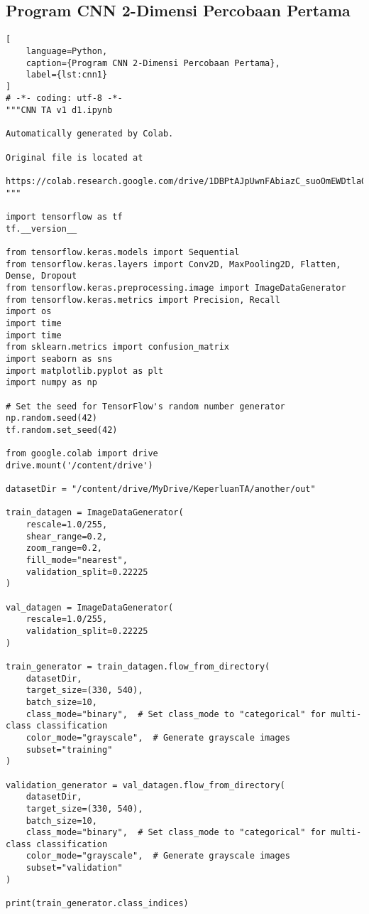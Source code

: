 \subsection*{Program CNN 2-Dimensi Percobaan Pertama}
\begin{lstlisting}[
    language=Python,
    caption={Program CNN 2-Dimensi Percobaan Pertama},
    label={lst:cnn1}
]
# -*- coding: utf-8 -*-
"""CNN TA v1 d1.ipynb

Automatically generated by Colab.

Original file is located at
    https://colab.research.google.com/drive/1DBPtAJpUwnFAbiazC_suoOmEWDtla0wC
"""

import tensorflow as tf
tf.__version__

from tensorflow.keras.models import Sequential
from tensorflow.keras.layers import Conv2D, MaxPooling2D, Flatten, Dense, Dropout
from tensorflow.keras.preprocessing.image import ImageDataGenerator
from tensorflow.keras.metrics import Precision, Recall
import os
import time
import time
from sklearn.metrics import confusion_matrix
import seaborn as sns
import matplotlib.pyplot as plt
import numpy as np

# Set the seed for TensorFlow's random number generator
np.random.seed(42)
tf.random.set_seed(42)

from google.colab import drive
drive.mount('/content/drive')

datasetDir = "/content/drive/MyDrive/KeperluanTA/another/out"

train_datagen = ImageDataGenerator(
    rescale=1.0/255,
    shear_range=0.2,
    zoom_range=0.2,
    fill_mode="nearest",
    validation_split=0.22225
)

val_datagen = ImageDataGenerator(
    rescale=1.0/255,
    validation_split=0.22225
)

train_generator = train_datagen.flow_from_directory(
    datasetDir,
    target_size=(330, 540),
    batch_size=10,
    class_mode="binary",  # Set class_mode to "categorical" for multi-class classification
    color_mode="grayscale",  # Generate grayscale images
    subset="training"
)

validation_generator = val_datagen.flow_from_directory(
    datasetDir,
    target_size=(330, 540),
    batch_size=10,
    class_mode="binary",  # Set class_mode to "categorical" for multi-class classification
    color_mode="grayscale",  # Generate grayscale images
    subset="validation"
)

print(train_generator.class_indices)


\end{lstlisting}
